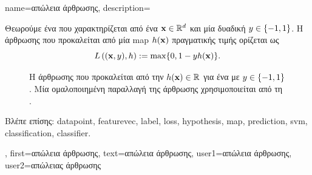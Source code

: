{name={\foreignlanguage{greek}{απώλεια άρθρωσης}}, 
	description={\foreignlanguage{greek}{Θεωρούμε ένα} 
		 \foreignlanguage{greek}{που χαρακτηρίζεται από ένα}  ${\bf x} \in \mathbb{R}^{d}$ 
		\foreignlanguage{greek}{και μία δυαδική}  $y \in \{-1,1\}$. \foreignlanguage{greek}{Η}  
		\foreignlanguage{greek}{άρθρωσης που προκαλείται από μία} \gls{map}  $h({\bf x})$ 
		\foreignlanguage{greek}{πραγματικής τιμής ορίζεται ως} 
		\begin{equation} 
			\label{equ_hinge_loss_gls_dict}
			L\left(({\bf x},y),h \right) := \max \{ 0 , 1 - y h({\bf x}) \}. 
		\end{equation}
		\begin{figure}[H]
		\begin{center}
		{
		\caption{\foreignlanguage{greek}{Η}  \foreignlanguage{greek}{άρθρωσης που προκαλείται από την}  
		$h({\bf x}) \in \mathbb{R}$ \foreignlanguage{greek}{για ένα}  \foreignlanguage{greek}{με} 
		 $y \in \{-1,1\}$. \foreignlanguage{greek}{Μία ομαλοποιημένη παραλλαγή της}  
		\foreignlanguage{greek}{άρθρωσης χρησιμοποιείται από τη}  \cite{LampertNowKernel}.}
		\label{fig_hingeloss_dict}}
		\end{center}
		\end{figure} 
	    	\foreignlanguage{greek}{Βλέπε επίσης:} \gls{datapoint}, \gls{featurevec}, \gls{label}, \gls{loss}, \gls{hypothesis}, \gls{map}, \gls{prediction}, \gls{svm}, 
		\gls{classification}, \gls{classifier}.},
	first={\foreignlanguage{greek}{απώλεια άρθρωσης}},
	text={\foreignlanguage{greek}{απώλεια άρθρωσης}},
	user1={\foreignlanguage{greek}{απώλεια άρθρωσης}}, %
	user2={\foreignlanguage{greek}{απώλειας άρθρωσης}} %
}

